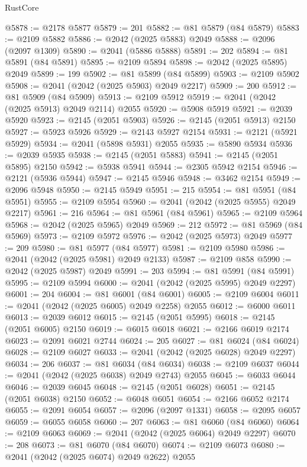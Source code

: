 \begin{lexlean}{RustCore}
\begin{coremodule}
@5878 := @2178 @5877
@5879 := 201
@5882 := @81 @5879 (@84 @5879)
@5883 := @2109 @5882
@5886 := @2042 (@2025 @5883) @2049
@5888 := @2096 (@2097 @1309)
@5890 := @2041 (@5886 @5888)
@5891 := 202
@5894 := @81 @5891 (@84 @5891)
@5895 := @2109 @5894
@5898 := @2042 (@2025 @5895) @2049
@5899 := 199
@5902 := @81 @5899 (@84 @5899)
@5903 := @2109 @5902
@5908 := @2041 (@2042 (@2025 @5903) @2049 @2217)
@5909 := 200
@5912 := @81 @5909 (@84 @5909)
@5913 := @2109 @5912
@5919 := @2041 (@2042 (@2025 @5913) @2049 @2114) @2055
@5920 := @5908 @5919
@5921 := @2039 @5920
@5923 := @2145 (@2051 @5903)
@5926 := @2145 (@2051 @5913) @2150
@5927 := @5923 @5926
@5929 := @2143 @5927 @2154
@5931 := @2121 (@5921 @5929)
@5934 := @2041 (@5898 @5931) @2055
@5935 := @5890 @5934
@5936 := @2039 @5935
@5938 := @2145 (@2051 @5883)
@5941 := @2145 (@2051 @5895) @2150
@5942 := @5938 @5941
@5944 := @2305 @5942 @2154
@5946 := @2121 (@5936 @5944)
@5947 := @2145 @5946
@5948 := @3462 @2154
@5949 := @2096 @5948
@5950 := @2145 @5949
@5951 := 215
@5954 := @81 @5951 (@84 @5951)
@5955 := @2109 @5954
@5960 := @2041 (@2042 (@2025 @5955) @2049 @2217)
@5961 := 216
@5964 := @81 @5961 (@84 @5961)
@5965 := @2109 @5964
@5968 := @2042 (@2025 @5965) @2049
@5969 := 212
@5972 := @81 @5969 (@84 @5969)
@5973 := @2109 @5972
@5976 := @2042 (@2025 @5973) @2049
@5977 := 209
@5980 := @81 @5977 (@84 @5977)
@5981 := @2109 @5980
@5986 := @2041 (@2042 (@2025 @5981) @2049 @2133)
@5987 := @2109 @858
@5990 := @2042 (@2025 @5987) @2049
@5991 := 203
@5994 := @81 @5991 (@84 @5991)
@5995 := @2109 @5994
@6000 := @2041 (@2042 (@2025 @5995) @2049 @2297)
@6001 := 204
@6004 := @81 @6001 (@84 @6001)
@6005 := @2109 @6004
@6011 := @2041 (@2042 (@2025 @6005) @2049 @2258) @2055
@6012 := @6000 @6011
@6013 := @2039 @6012
@6015 := @2145 (@2051 @5995)
@6018 := @2145 (@2051 @6005) @2150
@6019 := @6015 @6018
@6021 := @2166 @6019 @2174
@6023 := @2091 @6021 @2744
@6024 := 205
@6027 := @81 @6024 (@84 @6024)
@6028 := @2109 @6027
@6033 := @2041 (@2042 (@2025 @6028) @2049 @2297)
@6034 := 206
@6037 := @81 @6034 (@84 @6034)
@6038 := @2109 @6037
@6044 := @2041 (@2042 (@2025 @6038) @2049 @2743) @2055
@6045 := @6033 @6044
@6046 := @2039 @6045
@6048 := @2145 (@2051 @6028)
@6051 := @2145 (@2051 @6038) @2150
@6052 := @6048 @6051
@6054 := @2166 @6052 @2174
@6055 := @2091 @6054
@6057 := @2096 (@2097 @1331)
@6058 := @2095 @6057
@6059 := @6055 @6058
@6060 := 207
@6063 := @81 @6060 (@84 @6060)
@6064 := @2109 @6063
@6069 := @2041 (@2042 (@2025 @6064) @2049 @2297)
@6070 := 208
@6073 := @81 @6070 (@84 @6070)
@6074 := @2109 @6073
@6080 := @2041 (@2042 (@2025 @6074) @2049 @2622) @2055

\end{coremodule}
\end{lexlean}
